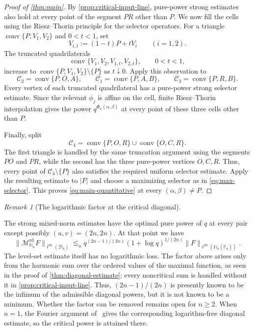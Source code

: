 \documentclass[11pt,letterpaper]{amsart}
\numberwithin{equation}{section}
\theoremstyle{definition}
\theoremstyle{remark}
\newtheorem{remark}[remark]{Remark}
\newcommand{\Fq}{\mathbb F_q}
\newcommand{\HH}{\mathbb H}
\newcommand{\Dn}{\mathcal D_n}
\newcommand{\Mrd}{\mathcal M^{\mathrm{rd}}_{\HH_n}}
\newcommand{\norm}[1]{\lVert #1\rVert}
\newcommand{\conv}{\operatorname{conv}}
\begin{document}
\begin{proof}[Proof of \cref{thm:main}]
By \cref{prop:critical-input-line}, pure-power strong estimates also hold at every point of the segment $PR$ other than $P$.  We now fill the cells using the Riesz--Thorin principle for the selector operators.  For a triangle $\conv\{P,V_1,V_2\}$ and $0<t<1$, set
\[
 V_{i,t}:=(1-t)P+tV_i\qquad(i=1,2).
\]
The truncated quadrilaterals
\[
 \conv\{V_1,V_2,V_{1,t},V_{2,t}\},\qquad 0<t<1,
\]
increase to $\conv\{P,V_1,V_2\}\setminus\{P\}$ as $t\downarrow0$.
Apply this observation to
\[
 \mathcal C_2=\conv\{P,O,A\},\qquad
 \mathcal C_1=\conv\{P,A,B\},\qquad
 \mathcal C_3=\conv\{P,R,B\}.
\]
Every vertex of each truncated quadrilateral has a pure-power strong selector estimate. Since the relevant $\phi_j$ is affine on the cell, finite Riesz--Thorin interpolation gives the power $q^{\Phi_n(\alpha,\beta)}$ at every point of these three cells other than $P$.

Finally, split
\[
 \mathcal C_4
 =\conv\{P,O,R\}\cup\conv\{O,C,R\}.
\]
The first triangle is handled by the same truncation argument using the segments $PO$ and $PR$, while the second has the three pure-power vertices $O,C,R$. Thus, every point of $\mathcal C_4\setminus\{P\}$ also satisfies the required uniform selector estimate. Apply the resulting estimate to $|F|$ and choose a maximizing selector as in \eqref{eq:max-selector}. This proves \eqref{eq:main-quantitative} at every
$(\alpha,\beta)\neq P$.
\end{proof}

\begin{remark}[The logarithmic factor at the critical diagonal]
\label{rem:exact-endpoint}

\setlength{\emergencystretch}{2em}
\setlength{\parskip}{0pt}
The strong mixed-norm estimates have the optimal pure power of $q$ at every pair except possibly $(u,v)=(2n,2n)$. At that point we have
\[
 \norm{\Mrd F}_{\ell^{2n}(\Dn)}
 \lesssim_n
 q^{(2n-1)/(2n)}(1+\log q)^{1/(2n)}
 \norm{F}_{\ell^{2n}(\HH_n(\Fq))}.
\]
The level-set estimate itself has no logarithmic loss.  The factor above arises only from the harmonic sum over the ordered values of the maximal function, as seen in the proof of \cref{thm:diagonal-estimate}; every noncritical sum is handled without it in
\cref{prop:critical-input-line}. Thus, $(2n-1)/(2n)$ is presently known to be the infimum of the admissible diagonal powers, but it is not known to be a minimum. Whether the factor can be removed remains open for $n\geq2$.
When $n=1$, the Fourier argument of~\cite{PPTX26} gives the corresponding logarithm-free diagonal estimate, so the critical power is attained there.
\end{remark}
\end{document}
